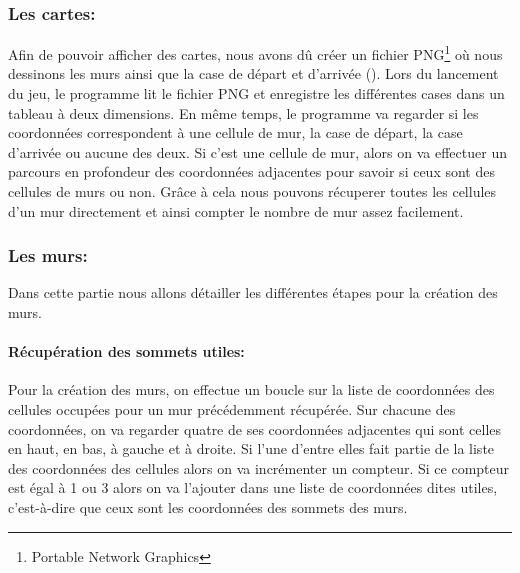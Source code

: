 \documentclass[11pt]{article}
\begin{document}
\subsubsection{Les cartes:}
Afin de pouvoir afficher des cartes, nous avons dû créer un fichier PNG\footnote{Portable Network Graphics} où nous dessinons les murs ainsi que la case de départ et d'arrivée (). Lors du lancement du jeu, le programme lit le fichier PNG et enregistre les différentes cases dans un tableau à deux dimensions. En même temps, le programme va regarder si les coordonnées correspondent à une cellule de mur, la case de départ, la case d'arrivée ou aucune des deux. Si c'est une cellule de mur, alors on va effectuer un parcours en profondeur des coordonnées adjacentes pour savoir si ceux sont des cellules de murs ou non. Grâce à cela nous pouvons récuperer toutes les cellules d'un mur directement et ainsi compter le nombre de mur assez facilement.
\subsubsection{Les murs:}

Dans cette partie nous allons détailler les différentes étapes pour la création des murs.

\paragraph{Récupération des sommets utiles:}

Pour la création des murs, on effectue un boucle sur la liste de coordonnées des cellules occupées pour un mur précédemment récupérée. Sur chacune des coordonnées, on va regarder quatre de ses coordonnées adjacentes qui sont celles en haut, en bas, à gauche et à droite. Si l'une d'entre elles fait partie de la liste des coordonnées des cellules alors on va incrémenter un compteur. Si ce compteur est égal à 1 ou 3 alors on va l'ajouter dans une liste de coordonnées dites utiles, c'est-à-dire que ceux sont les coordonnées des sommets des murs.
\end{document}
